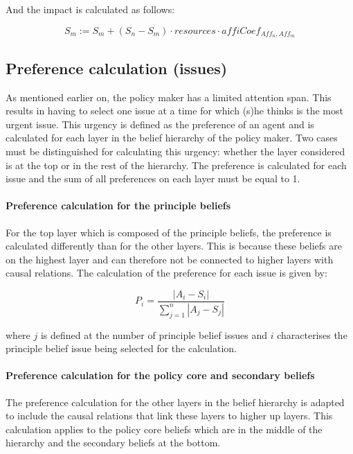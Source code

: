 And the impact is calculated as follows:

\begin{equation}
S_{m} := S_{m} + \left(S_{n} - S_{m} \right) \cdot resources \cdot affiCoef_{Aff_n,Aff_m}
\end{equation}

\subsection{Preference calculation (issues)}

As mentioned earlier on, the policy maker has a limited attention span. This results in having to select one issue at a time for which (s)he thinks is the most urgent issue. This urgency is defined as the preference of an agent and is calculated for each layer in the belief hierarchy of the policy maker. Two cases must be distinguished for calculating this urgency: whether the layer considered is at the top or in the rest of the hierarchy. The preference is calculated for each issue and the sum of all preferences on each layer must be equal to 1.

\paragraph{Preference calculation for the principle beliefs}

For the top layer which is composed of the principle beliefs, the preference is calculated differently than for the other layers. This is because these beliefs are on the highest layer and can therefore not be connected to higher layers with causal relations. The calculation of the preference for each issue is given by:

\begin{equation}
P_i = \frac{ |A_i - S_i|}{\sum_{j=1}^n |A_j - S_j|}
\end{equation}

where $j$ is defined at the number of principle belief issues and $i$ characterises the principle belief issue being selected for the calculation.

\paragraph{Preference calculation for the policy core and secondary beliefs}

The preference calculation for the other layers in the belief hierarchy is adapted to include the causal relations that link these layers to higher up layers. This calculation applies to the policy core beliefs which are in the middle of the hierarchy and the secondary beliefs at the bottom.

